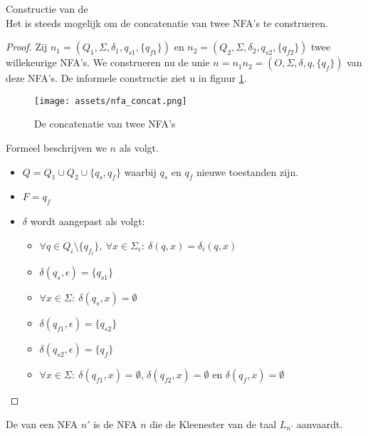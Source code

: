 \documentclass[main.tex]{subfiles}
\begin{document}
\begin{st}
  Constructie van de \\
  Het is steeds mogelijk om de concatenatie van twee NFA's te construeren.

  \begin{proof}
    Zij $n_{1} = (Q_{1},\Sigma,\delta_{1},q_{s1},\{q_{f1}\})$ en $n_{2} = (Q_{2},\Sigma,\delta_{2},q_{s2},\{q_{f2}\})$ twee willekeurige NFA's. We construeren nu de unie $n = n_{1}n_{2} = (O,\Sigma,\delta,q,\{q_{f}\})$ van deze NFA's.
    De informele constructie ziet u in figuur \ref{fig:nfa_concat}.
    \begin{figure}[H]
      \centering
      \texttt{[image: assets/nfa\_concat.png]}      
      \caption{De concatenatie van twee NFA's}
      \label{fig:nfa_concat}
    \end{figure}
    Formeel beschrijven we $n$ als volgt.
    \begin{itemize}
    \item $Q = Q_{1} \cup Q_{2} \cup \{ q_{s}, q_{f} \}$ waarbij $q_{s}$ en $q_{f}$ nieuwe toestanden zijn.
    \item $F = {q_{f}}$
    \item $\delta$ wordt aangepast als volgt:
      \begin{itemize}
      \item $\forall q \in Q_{i}\setminus\{q_{f_{i}}\},\ \forall x \in \Sigma_{\epsilon}:\ \delta(q,x) = \delta_{i}(q,x)$
      \item $\delta(q_{s},\epsilon) = \{q_{s1}\}$
      \item $\forall x \in \Sigma:\ \delta(q_{s},x) = \emptyset$
      \item $\delta(q_{f1},\epsilon) = \{q_{s2}\}$
      \item $\delta(q_{s2},\epsilon) = \{q_{f}\}$
      \item $\forall x \in \Sigma:\ \delta(q_{f1},x) = \emptyset$, $\delta(q_{f2},x) = \emptyset$ en $\delta(q_{f},x) = \emptyset$ 
      \end{itemize}
    \end{itemize}
  \end{proof}
\end{st}

\begin{de}
  De  van een NFA $n'$ is de NFA $n$ die de Kleenester van de taal $L_{n'}$ aanvaardt.
\end{de}
\end{document}
